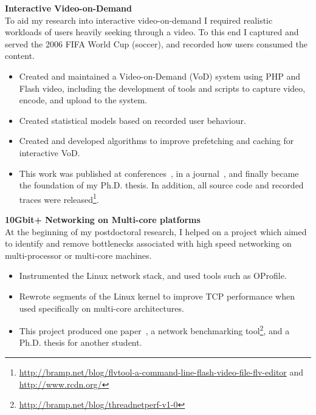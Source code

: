 \documentclass[a4paper,10pt]{article}
\begin{document}
\textbf{Interactive Video-on-Demand}\\
To aid my research into interactive video-on-demand I required realistic workloads of users heavily seeking through a video. To this end I captured and served the 2006 FIFA World Cup (soccer), and recorded how users consumed the content.

\begin{itemize}
 \item Created and maintained a Video-on-Demand (VoD) system using PHP and Flash video, including the development of tools and scripts to capture video, encode, and upload to the system.
 \item Created statistical models based on recorded user behaviour.
 \item Created and developed algorithms to improve prefetching and caching for interactive VoD.
 \item This work was published at conferences~\cite{brampton2007cui,macquire2008acf}, in a journal~\cite{brampton2008cew}, and finally became the foundation of my Ph.D. thesis. In addition, all source code and recorded traces were released\footnote{\href{http://bramp.net/blog/flvtool-a-command-line-flash-video-file-flv-editor}{http://bramp.net/blog/flvtool-a-command-line-flash-video-file-flv-editor} and \href{http://www.rcdn.org/}{http://www.rcdn.org/}}.
\end{itemize}
\vspace{1em}

\textbf{10Gbit+ Networking on Multi-core platforms}\\
 At the beginning of my postdoctoral research, I helped on a project which aimed to identify and remove bottlenecks associated with high speed networking on multi-processor or multi-core machines.

\begin{itemize}
 \item Instrumented the Linux network stack, and used tools such as OProfile.
 \item Rewrote segments of the Linux kernel to improve TCP performance when used specifically on multi-core architectures.
 \item This project produced one paper~\cite{faulkner2009epn}, a network benchmarking tool\footnote{\href{http://bramp.net/blog/threadnetperf-v1-0}{http://bramp.net/blog/threadnetperf-v1-0}}, and a Ph.D. thesis for another student.
\end{itemize}
\vspace{1em}
\end{document}
